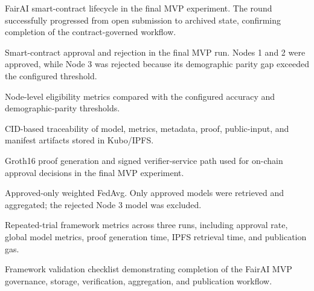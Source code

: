 \caption{FairAI smart-contract lifecycle in the final MVP experiment. The round successfully progressed from open submission to archived state, confirming completion of the contract-governed workflow.} %
\caption{Smart-contract approval and rejection in the final MVP run. Nodes 1 and 2 were approved, while Node 3 was rejected because its demographic parity gap exceeded the configured threshold.} %
\caption{Node-level eligibility metrics compared with the configured accuracy and demographic-parity thresholds.} %
\caption{CID-based traceability of model, metrics, metadata, proof, public-input, and manifest artifacts stored in Kubo/IPFS.} %
\caption{Groth16 proof generation and signed verifier-service path used for on-chain approval decisions in the final MVP experiment.} %
\caption{Approved-only weighted FedAvg. Only approved models were retrieved and aggregated; the rejected Node 3 model was excluded.} %
\caption{Repeated-trial framework metrics across three runs, including approval rate, global model metrics, proof generation time, IPFS retrieval time, and publication gas.} %
\caption{Framework validation checklist demonstrating completion of the FairAI MVP governance, storage, verification, aggregation, and publication workflow.} %
